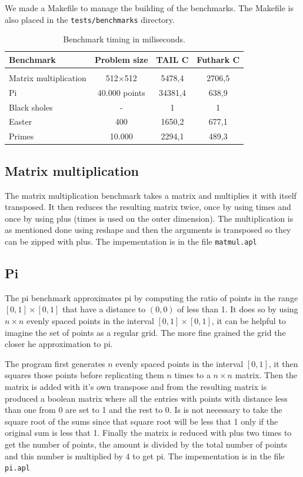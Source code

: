 \documentclass[11pt]{article}
\begin{document}
We made a Makefile to manage the building of the benchmarks. The Makefile is also placed in the {\tt tests/benchmarks} directory.

\begin{table} 
\begin{center}
\label{tbl:benchmark}
\begin{tabular}{l c c c}
Benchmark & Problem size & TAIL C & Futhark C \\ \hline \\
Matrix multiplication    & 512$\times$512 &  5478,4     & 2706,5  \\
Pi		     	         & 40.000 points     &  34381,4   & 638,9 \\
Black sholes               & - 			    & 1               & 1 \\
Easter                         & 400 		    & 1650,2      & 677,1 \\
Primes                        & 10.000                & 2294,1      & 489,3 \\
\end{tabular}
\caption{Benchmark timing in miliseconds.}
\end{center}
\end{table}

\subsection{Matrix multiplication}
The matrix multiplication benchmark takes a matrix and multiplies it with itself transposed.
It then reduces the resulting matrix twice, once by using times and once by using plus (times is used on the outer dimension).
The multiplication is as mentioned done using reshape and then the arguments is transposed so they can be zipped with plus.
The impementation is in the file {\tt matmul.apl}
\subsection{Pi}
The pi benchmark approximates pi by computing the ratio of points in the range $[0,1] \times [0,1]$ that have a distance to $(0,0)$ of less than 1.
It does so by using $n \times n$ evenly spaced points in the interval $[0,1] \times [0,1]$, it can be helpful to imagine the set of points as a regular grid.
The more fine grained the grid the closer he approximation to pi.

The program first generates $n$ evenly spaced points in the interval $[0,1]$, it then squares those points before replicating them $n$ times to a $n \times n$ matrix.
Then the matrix is added with it's own transpose and from the resulting matrix is produced a boolean matrix
where all the entries with points with distance less than one from 0 are set to 1 and the rest to 0. Is is not necessary to take
the square root of the sums since that square root will be less that 1 only if the original sum is less that 1.
Finally the matrix is reduced with plus two times to get the number of points, the amount is divided by the total number of points and
this number is multiplied by 4 to get pi.
The impementation is in the file {\tt pi.apl}
\end{document}
